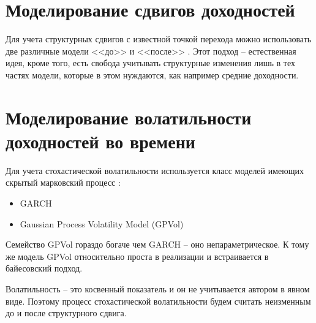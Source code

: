 \section{Моделирование сдвигов доходностей}
Для учета структурных сдвигов с известной точкой перехода можно использовать две различные модели <<до>> и <<после>> \citep{salazar1982}. Этот подход -- естественная идея, кроме того, есть свобода учитывать структурные изменения лишь в тех частях модели, которые в этом нуждаются, как например средние доходности.

\section{Моделирование волатильности доходностей во времени}
Для учета стохастической волатильности используется класс моделей имеющих скрытый марковский процесс \citep{ghahramani2001}:
\begin{itemize}
	\item GARCH \citep{engle1982}
	\item Gaussian Process Volatility Model (GPVol) \citep{han2016}
\end{itemize}
Семейство GPVol гораздо богаче чем GARCH -- оно непараметрическое. К тому же модель GPVol относительно проста в реализации и встраивается в байесовский подход.

Волатильность -- это косвенный показатель и он не учитывается автором в явном виде. Поэтому процесс стохастической волатильности будем считать неизменным до и после структурного сдвига.

